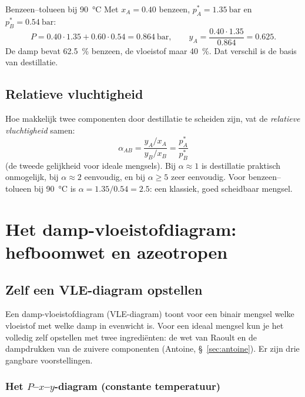 \begin{voorbeeld}{Benzeen--tolueen bij \SI{90}{\celsius}}
Met $x_A = 0.40$ benzeen, $p_A^* = \SI{1.35}{\bar}$ en $p_B^* = \SI{0.54}{\bar}$:
\[
P = 0.40 \cdot 1.35 + 0.60 \cdot 0.54 = \SI{0.864}{\bar}, \qquad y_A = \frac{0.40 \cdot 1.35}{0.864} = 0.625.
\]
De damp bevat \SI{62.5}{\percent} benzeen, de vloeistof maar \SI{40}{\percent}. Dat verschil is de basis van destillatie.
\end{voorbeeld}

\subsection{Relatieve vluchtigheid}
\label{sec:relatieve-vluchtigheid}

Hoe makkelijk twee componenten door destillatie te scheiden zijn, vat de \emph{relatieve vluchtigheid} samen:
\begin{equation}
\boxed{\;\alpha_{AB} = \frac{y_A/x_A}{y_B/x_B} = \frac{p_A^*}{p_B^*}\;}
\end{equation}
(de tweede gelijkheid voor ideale mengsels). Bij $\alpha \approx 1$ is destillatie praktisch onmogelijk, bij $\alpha \approx 2$ eenvoudig, en bij $\alpha \geq 5$ zeer eenvoudig. Voor benzeen--tolueen bij \SI{90}{\celsius} is $\alpha = 1.35/0.54 = 2.5$: een klassiek, goed scheidbaar mengsel.

\section{Het damp-vloeistofdiagram: hefboomwet en azeotropen}

\subsection{Zelf een VLE-diagram opstellen}
\label{sec:vle-diagram}

Een damp-vloeistofdiagram (VLE-diagram) toont voor een binair mengsel welke vloeistof met welke damp in evenwicht is. Voor een ideaal mengsel kun je het volledig zelf opstellen met twee ingredi\"enten: de wet van Raoult en de dampdrukken van de zuivere componenten (Antoine, \S~\ref{sec:antoine}). Er zijn drie gangbare voorstellingen.

\subsubsection{Het $P$--$x$--$y$-diagram (constante temperatuur)}

